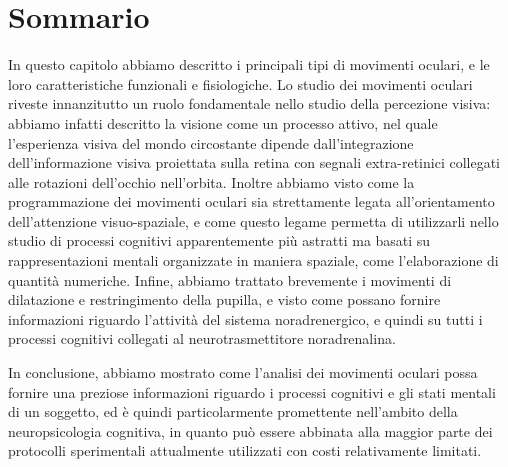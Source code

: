 \documentclass[12pt]{article}
\newcommand{\myreferences}{/Users/matteo/Documents/library.bib}
\begin{document}
\section{Sommario}
In questo capitolo abbiamo descritto i principali tipi di movimenti oculari, e le loro caratteristiche funzionali e fisiologiche. Lo studio dei movimenti oculari riveste innanzitutto un ruolo fondamentale nello studio della percezione visiva: abbiamo infatti descritto la visione come un processo attivo, nel quale l'esperienza visiva del mondo circostante dipende dall'integrazione dell'informazione visiva proiettata sulla retina con segnali extra-retinici collegati alle rotazioni dell'occhio nell'orbita. Inoltre abbiamo visto come la programmazione dei movimenti oculari sia strettamente legata all'orientamento dell'attenzione visuo-spaziale, e come questo legame permetta di utilizzarli nello studio di processi cognitivi apparentemente più astratti ma basati su rappresentazioni mentali organizzate in maniera spaziale, come l'elaborazione di quantità numeriche. Infine, abbiamo trattato brevemente i movimenti di dilatazione e restringimento della pupilla, e visto come possano fornire informazioni riguardo l'attività del sistema noradrenergico, e quindi su tutti i processi cognitivi collegati al neurotrasmettitore noradrenalina. 

In conclusione, abbiamo mostrato come l'analisi dei movimenti oculari possa fornire una preziose informazioni riguardo i processi cognitivi e gli stati mentali di un soggetto, ed è quindi particolarmente promettente nell'ambito della neuropsicologia cognitiva, in quanto può essere abbinata alla maggior parte dei protocolli sperimentali attualmente utilizzati con costi relativamente limitati.



\end{document}
